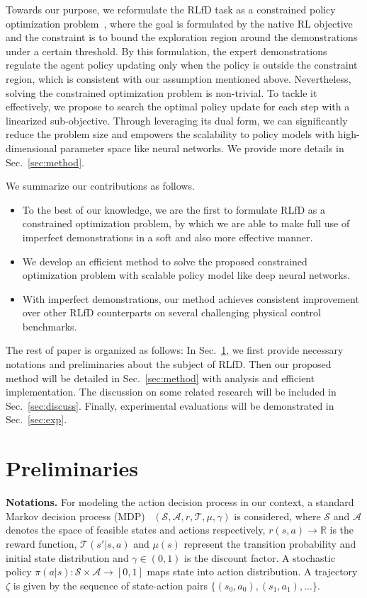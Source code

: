 \documentclass[letterpaper]{article} %
\begin{document}
Towards our purpose, we reformulate the RLfD task as a constrained policy optimization problem~\cite{cmdp,cpo,rcpo}, where the goal is formulated by the native RL objective and the constraint is to bound the exploration region around the demonstrations under a certain threshold. By this formulation, the expert demonstrations regulate the agent policy updating only when the policy is outside the constraint region, which is consistent with our assumption mentioned above. Nevertheless, solving the constrained optimization problem is non-trivial. To tackle it effectively, we propose to search the optimal policy update for each step with a linearized sub-objective. Through leveraging its dual form, we can significantly reduce the problem size and empowers the scalability to policy models with high-dimensional parameter space like neural networks. We provide more details in Sec.~\ref{sec:method}.

We summarize our contributions as follows.
\begin{itemize}
    \item To the best of our knowledge, we are the first to formulate RLfD as a constrained optimization problem, by which we are able to make full use of imperfect demonstrations in a soft and also more effective manner.
    \item We develop an efficient method to solve the proposed constrained optimization problem with scalable policy model like deep neural networks.
    \item With imperfect demonstrations, our method achieves consistent improvement over other RLfD counterparts on several challenging physical control benchmarks.
\end{itemize}

The rest of paper is organized as follows: In Sec.~\ref{sec:bg}, we first provide necessary notations and preliminaries about the subject of RLfD. Then our proposed method will be detailed in Sec.~\ref{sec:method} with analysis and efficient implementation. The discussion on some related research will be included in Sec.~\ref{sec:discuss}. Finally, experimental evaluations will be demonstrated in Sec.~\ref{sec:exp}.

\section{Preliminaries}\label{sec:bg}
\noindent
\textbf{Notations.} For modeling the action decision process in our context, a standard Markov decision process (MDP)~\cite{rl_book} $(\mathcal{S}, \mathcal{A}, r, \mathcal{T}, \mu, \gamma)$ is considered, where $\mathcal{S}$ and $\mathcal{A}$ denotes the space of feasible states and actions respectively, $r(s,a)\rightarrow \mathbb{R}$ is the reward function,
$\mathcal{T}(s'|s,a)$ and $\mu(s)$ represent the transition probability and initial state distribution and $\gamma \in (0, 1)$ is the discount factor. A stochastic policy $\pi(a|s): \mathcal{S}\times\mathcal{A} \rightarrow [0,1]$ maps state into action distribution. A trajectory $\zeta$ is given by the sequence of state-action pairs $\{(s_0, a_0),(s_1, a_1),...\}$. 
\end{document}
